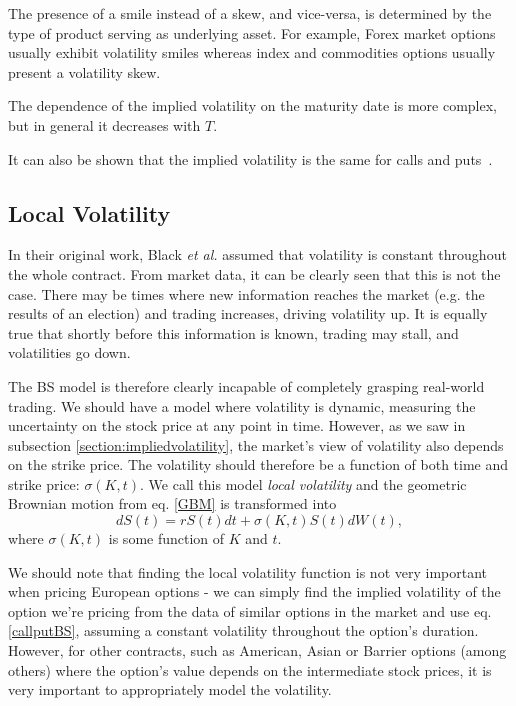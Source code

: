 The presence of a smile instead of a skew, and vice-versa, is determined by the type of product serving as underlying asset. For example, Forex market options usually exhibit volatility smiles whereas index and commodities options usually present a volatility skew.

The dependence of the implied volatility on the maturity date is more complex, but in general it decreases with $T$.

It can also be shown that the implied volatility is the same for calls and puts~\cite{Hull}.

\subsection{Local Volatility}
\label{subsection:localvolatility}
In their original work, Black \textit{et al.} assumed that volatility is constant throughout the whole contract. From market data, it can be clearly seen that this is not the case. There may be times where new information reaches the market  (e.g. the results of an election) and trading increases, driving volatility up. It is equally true that shortly before this information is known, trading may stall, and volatilities go down. 

The BS model is therefore clearly incapable of completely grasping real-world trading. We should have a model where volatility is dynamic, measuring the uncertainty on the stock price at any point in time.
However, as we saw in subsection \ref{section:impliedvolatility}, the market's view of volatility also depends on the strike price.
The volatility should therefore be a function of both time and strike price: $\sigma(K,t)$. We call this model \emph{local volatility} and the geometric Brownian motion from eq. \ref{GBM} is transformed into
\begin{equation}\label{GBM2}
dS(t)=rS(t)dt+\sigma(K,t)S(t)dW(t),
\end{equation}
\noindent where $\sigma(K,t)$ is some function of $K$ and $t$.


We should note that finding the local volatility function is not very important when pricing European options - we can simply find the implied volatility of the option we're pricing from the data of similar options in the market and use eq.\eqref{callputBS}, assuming a constant volatility throughout the option's duration.
However, for other contracts, such as American, Asian or Barrier options (among others) where the option's value depends on the intermediate stock prices, it is very important to appropriately model the volatility.

